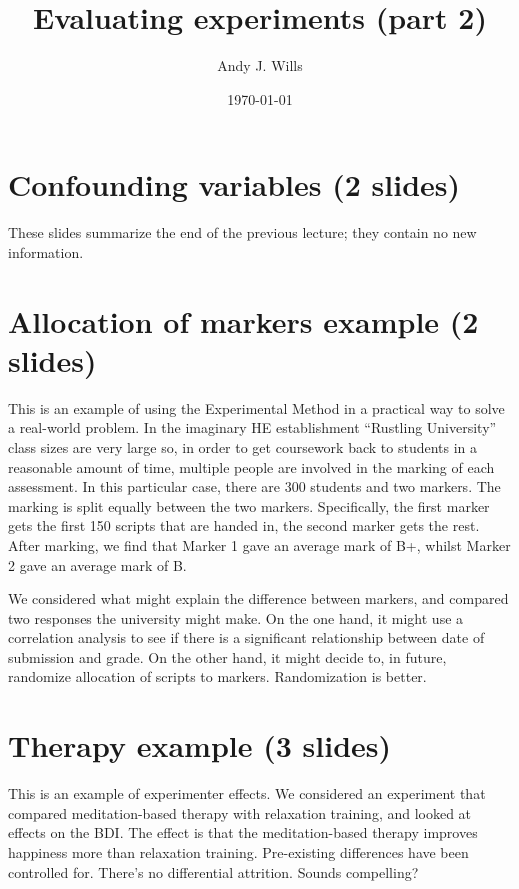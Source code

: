 \documentclass[12pt]{article}
\begin{document}
	\title{Evaluating experiments (part 2)}
	\date{\today}
	\author{Andy J. Wills}
	\maketitle

\section{Confounding variables (2 slides)}

These slides summarize the end of the previous lecture; they contain no new information.

\section{Allocation of markers example (2 slides)}

This is an example of using the Experimental Method in a practical way
to solve a real-world problem. In the imaginary HE establishment
``Rustling University'' class sizes are very large so, in order to get
coursework back to students in a reasonable amount of time, multiple
people are involved in the marking of each assessment. In this
particular case, there are 300 students and two markers. The marking
is split equally between the two markers. Specifically, the first
marker gets the first 150 scripts that are handed in, the second
marker gets the rest. After marking, we find that Marker 1 gave an
average mark of B+, whilst Marker 2 gave an average mark of B.

We considered what might explain the difference between markers, and
compared two responses the university might make. On the one hand, it
might use a correlation analysis to see if there is a significant
relationship between date of submission and grade. On the other hand,
it might decide to, in future, randomize allocation of scripts to
markers. Randomization is better.

\section{Therapy example (3 slides)}

This is an example of experimenter effects. We considered an
experiment that compared meditation-based therapy with relaxation
training, and looked at effects on the BDI. The effect is that the
meditation-based therapy improves happiness more than relaxation
training. Pre-existing differences have been controlled for. There's
no differential attrition. Sounds compelling?
\end{document}
